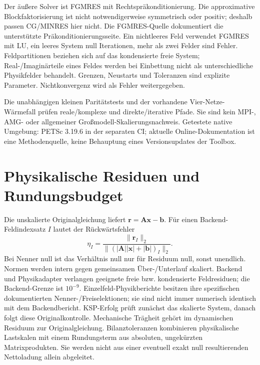 Der äußere Solver ist FGMRES mit Rechtspräkonditionierung. Die approximative
Blockfaktorisierung ist nicht notwendigerweise symmetrisch oder positiv;
deshalb passen CG/MINRES hier nicht. Die FGMRES-Quelle \cite{petsc-fgmres}
dokumentiert die unterstützte Präkonditionierungsseite. Ein nichtleeres Feld
verwendet FGMRES mit LU, ein leeres System null Iterationen, mehr als zwei
Felder sind Fehler. Feldpartitionen beziehen sich auf das kondensierte freie
System; Real-/Imaginärteile eines Feldes werden bei Einbettung nicht als
unterschiedliche Physikfelder behandelt. Grenzen, Neustarts und Toleranzen
sind explizite Parameter. Nichtkonvergenz wird als Fehler weitergegeben.

Die unabhängigen kleinen Paritätstests und der vorhandene Vier-Netze-Wärmefall
prüfen reale/komplexe und direkte/iterative Pfade. Sie sind kein MPI-, AMG-
oder allgemeiner Großmodell-Skalierungsnachweis. Getestete native Umgebung:
PETSc 3.19.6 in der separaten CI; aktuelle Online-Dokumentation ist eine
Methodenquelle, keine Behauptung eines Versionsupdates der Toolbox.

\section{Physikalische Residuen und Rundungsbudget}
Die unskalierte Originalgleichung liefert $\mathbf r=\mathbf A\mathbf x-\mathbf b$.
Für einen Backend-Feldindexsatz $I$ lautet der Rückwärtsfehler
\begin{equation}\label{eq:backward-error}
\eta_I=\frac{\|\mathbf r_I\|_2}
{\|(|\mathbf A||\mathbf x|+|\mathbf b|)_I\|_2}.
\end{equation}
Bei Nenner null ist das Verhältnis null nur für Residuum null, sonst unendlich.
Normen werden intern gegen gemeinsamen Über-/Unterlauf skaliert.
Backend und Physikadapter verlangen geeignete freie bzw. kondensierte
Feldresiduen; die Backend-Grenze ist $10^{-9}$.
Einzelfeld-Physikberichte besitzen ihre spezifischen dokumentierten
Nenner-/Freiselektionen; sie sind nicht immer numerisch identisch mit dem
Backendbericht. KSP-Erfolg prüft zunächst das skalierte System, danach folgt
diese Originalkontrolle. Mechanische Trägheit gehört im dynamischen Residuum
zur Originalgleichung. Bilanztoleranzen kombinieren physikalische Lastskalen
mit einem Rundungsterm aus absoluten, ungekürzten Matrixprodukten.
Sie werden nicht aus einer eventuell exakt null resultierenden Nettoladung
allein abgeleitet.

